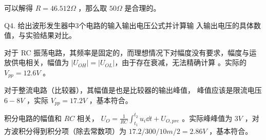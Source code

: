 \documentclass[lang=cn,11pt,a4paper,cite=authoryear]{elegantpaper}
\begin{document}
可以解得 \(R = 46.512 \Omega\) ，那么取 \(50 \Omega\) 是合理的。


Q4. 给出波形发生器中3个电路的输入输出电压公式并计算输
入输出电压的具体数值，与实验结果对比。

对于 RC 振荡电路，其频率是固定的，而理想情况下对幅度没有要求，幅度与运放供电相关，幅值为 \(|U_{OH}|  = |U_{OL} |\)，由于存在衰减，无法精确计算 。实际的 \(V_{pp } = 12.6 V\) 。

对于整流电路（比较器），其幅值是也是比较器的输出峰值， 峰值应该是限流电压 \(6-8V\) ，实际 \(V_{pp} = 17.2 V \)  ，基本符合。

积分电路的幅值和 \(RC\) 相关， \(U_{O} = \frac{1}{RC} \int_{t_1}^{t_2} u_{i} \dd{t} + U_{O,pre} \) 。实际峰峰值为 \(3 V\) ，对方波积分得到积分项（除去常数项）为 \(17.2 / 300 / 10 m / 2 = 2.86 V\) ，基本符合。


\end{document}
